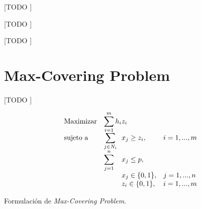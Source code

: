 \documentclass[spanish]{article}
\begin{document}
			\begin{table}[p]
				\begin{center}
				\end{center}
				\caption{[TODO ]}
				\label{}
			\end{table}

			\begin{table}[p]
				\begin{center}
				\end{center}
				\caption{[TODO ]}
				\label{}
			\end{table}

			\begin{table}[p]
				\begin{center}
				\end{center}
				\caption{[TODO ]}
				\label{}
			\end{table}

	\section{Max-Covering Problem}
	\label{sec:e-7}

		\paragraph{}
		[TODO ]

		\begin{eqfloat}
			\begin{equation}
				\begin{array}{ll@{}ll}
					\text{Maximizar}
						& \displaystyle\sum\limits_{i = 1}^{m} h_{i} & z_{i} 			&							\\
					\text{sujeto a}
						& \displaystyle\sum\limits_{j \in N_i}& x_{j} \geq z_i,		&i=1 ,..., m	\\
						& \displaystyle\sum\limits_{j = 1}^n 	& x_{j} \leq p,  		& 						\\
						&                                     &	x_{j} \in \{0,1\},&j=1 ,..., n 	\\
						&                                     &	z_{i} \in \{0,1\},&i=1 ,..., m  \\
				\end{array}
			\end{equation}
			\caption{Formulación de \emph{Max-Covering Problem}.}
			\label{eq:max_covering}
		\end{eqfloat}
\end{document}
